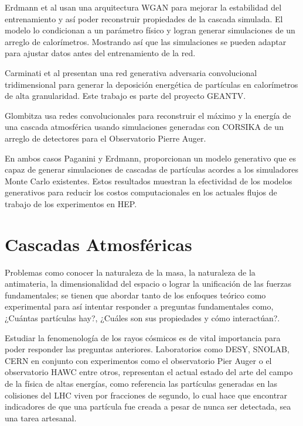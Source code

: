 Erdmann et al usan una arquitectura WGAN para mejorar la estabilidad del entrenamiento y así poder reconstruir propiedades de la cascada simulada. El modelo lo condicionan a un parámetro físico y logran generar simulaciones de un arreglo de calorímetros. Mostrando así que las simulaciones se pueden adaptar para ajustar datos antes del entrenamiento de la red. 

Carminati et al presentan una red generativa adversaria convolucional tridimensional para generar la deposición energética de partículas en calorímetros de alta granularidad. Este trabajo es parte del proyecto GEANTV.

Glombitza usa redes convolucionales para reconstruir el máximo y la energía de una cascada atmosférica usando simulaciones generadas con CORSIKA de un arreglo de detectores para el Observatorio Pierre Auger.

En ambos casos Paganini y Erdmann, proporcionan un modelo generativo que es capaz de generar simulaciones de cascadas de partículas acordes a los simuladores Monte Carlo existentes. Estos resultados muestran la efectividad de los modelos generativos para reducir los costos computacionales en los actuales flujos de trabajo de los experimentos en HEP.  

\section{Cascadas Atmosféricas}

Problemas como conocer la naturaleza de la masa, la naturaleza de la antimateria, la dimensionalidad del espacio o lograr la unificación de las fuerzas fundamentales; se tienen que abordar tanto de los enfoques teórico como experimental para así intentar responder a preguntas fundamentales como, ¿Cuántas partículas hay?, ¿Cuáles son sus propiedades y cómo interactúan?.

Estudiar la fenomenología de los rayos cósmicos es de vital importancia para poder responder las preguntas anteriores. Laboratorios como DESY, SNOLAB, CERN en conjunto con experimentos como el observatorio Pier Auger o el observatorio HAWC entre otros, representan el actual estado del arte del campo de la física de altas energías, como referencia las partículas generadas en las colisiones del LHC viven por fracciones de segundo, lo cual hace que encontrar indicadores de que una partícula fue creada a pesar de nunca ser detectada, sea una tarea artesanal.

